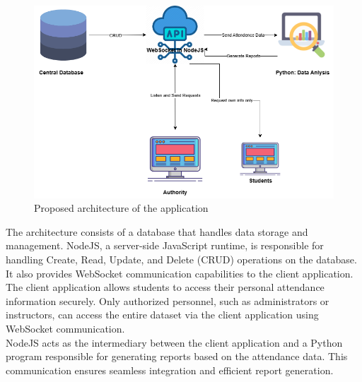 \begin{figure}[H]
    \includegraphics[width=\linewidth]{figures/architecture.png}
    \centering
    \caption{Proposed architecture of the application}
    \label{fig:arch}
\end{figure}

The architecture consists of a database that handles data storage and management. NodeJS, a server-side JavaScript runtime, is responsible for handling Create, Read, Update, and Delete (CRUD) operations on the database. It also provides WebSocket communication capabilities to the client application.\\

The client application allows students to access their personal attendance information securely. Only authorized personnel, such as administrators or instructors, can access the entire dataset via the client application using WebSocket communication.\\

NodeJS acts as the intermediary between the client application and a Python program responsible for generating reports based on the attendance data. This communication ensures seamless integration and efficient report generation.\\

